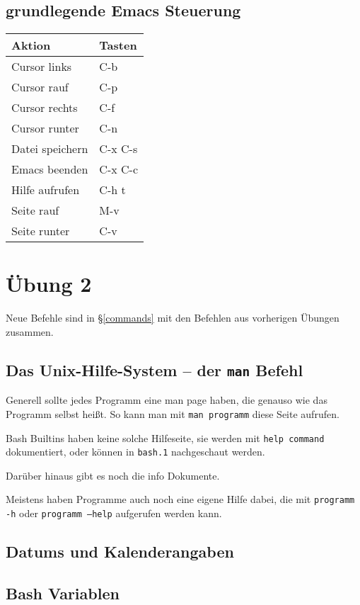 \documentclass[12pt]{report}
\begin{document}
\section{grundlegende Emacs Steuerung}

\begin{tabular}{ll}
Aktion & Tasten \\
\hline
Cursor links & C-b \\
Cursor rauf & C-p \\
Cursor rechts & C-f \\
Cursor runter & C-n \\
Datei speichern & C-x C-s \\
Emacs beenden & C-x C-c \\
Hilfe aufrufen & C-h t \\
Seite rauf & M-v \\
Seite runter & C-v \\
\end{tabular}

\chapter{Übung 2}

Neue Befehle sind in §\ref{commands} mit den Befehlen aus vorherigen Übungen zusammen.

\section{Das Unix-Hilfe-System -- der \texttt{man} Befehl}

Generell sollte jedes Programm eine man page haben, die genauso wie das Programm selbst heißt. So kann man mit \texttt{man programm} diese Seite aufrufen.

Bash Builtins haben keine solche Hilfeseite, sie werden mit \texttt{help command} dokumentiert, oder können in \texttt{bash.1} nachgeschaut werden.

Darüber hinaus gibt es noch die info Dokumente.

Meistens haben Programme auch noch eine eigene Hilfe dabei, die mit \texttt{programm -h} oder \texttt{programm --help} aufgerufen werden kann.

\section{Datums und Kalenderangaben}

\section{Bash Variablen}
\end{document}
